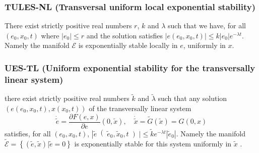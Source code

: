 \documentclass[letterpaper, 10 pt, conference]{ieeeconf}
\begin{document}
\subsubsection{TULES-NL (Transversal uniform local exponential stability)}
There exist strictly positive real numbers $r$, $k$ and $\lambda$ such that we have, for all $\left(e_0, x_0, t\right)$  where $\left| e_0\right| \le r$ and the solution satisfies $\left|e\left(e_0, x_0, t\right)\right| \le k\left|e_0\right| e^{-\lambda t}$. Namely the manifold $\mathscr{E}$ is exponentially stable locally in $e$, uniformly in $x$.
\subsubsection{UES-TL (Uniform exponential stability for the transversally linear system)}
there exist strictly positive real numbers $\tilde{ k}$ and $\tilde{\lambda}$  such that any solution $\left(e \left(e_0, x_0, t\right), x \left(x_0, t\right)\right)$ of the transversally linear system
$$\dot{\tilde{e}} = \frac{\partial F(e,x)}{\partial e}\left(0,\tilde{x}\right) ,\quad \dot{\tilde{x}} = \tilde{G}  \left( \tilde{x}  \right) =G\left(0,x\right)$$
satisfies, for all $\left(e_0,x_0,t\right)$,   
 $ \left| \tilde{e}\right(\tilde{e}_0,\tilde{x}_0,t \left) \right| \le \tilde{k} e^{-\lambda t} \left| \tilde{e}_0\right|$. Namely the manifold $\tilde{\mathscr{E}}=\left\{\left(\tilde{e},\tilde{x} \right)| \tilde{e} = 0 \right\}$  is exponentially stable for this system uniformly in $\tilde{x}$ .
\end{document}
